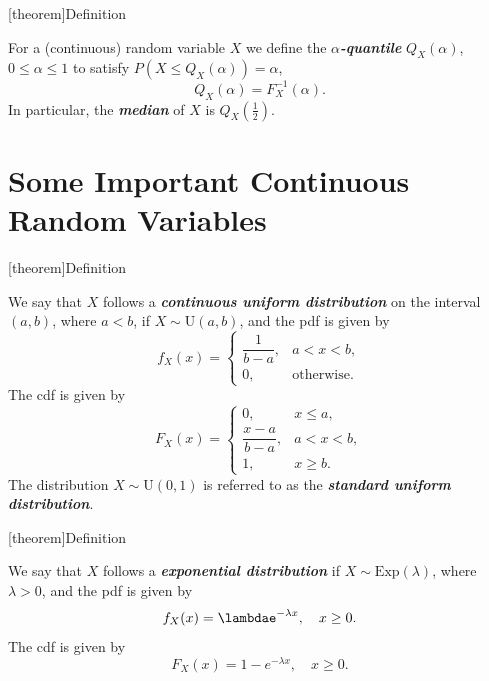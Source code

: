 \documentclass[12pt]{report}
\theoremstyle{definition}
\begin{document}
[theorem]{Definition}
\begin{quantiles}
    For a (continuous) random variable $X$ we define the
    \textbf{\emph{$\alpha$-quantile}} $Q_X(\alpha)$,
    $0\le\alpha\le 1$ to satisfy $P(X\le Q_X(\alpha))=\alpha$,
    \[
        Q_X(\alpha)=F_X^{-1}(\alpha).
    \]
    In particular, the \textbf{\emph{median}} of $X$ is
    $Q_X\left(\frac{1}{2}\right)$.
\end{quantiles}

\section{Some Important Continuous Random Variables}

[theorem]{Definition}
\begin{continuous uniform distribution}
    We say that $X$ follows a \textbf{\emph{continuous uniform distribution}} 
    on the interval $(a,b)$, where $a<b$, if
    $X\sim\text{U}(a,b)$, and the pdf is
    given by
    \[
        f_X(x)=
        \begin{cases}
            \dfrac{1}{b-a}, & a<x<b, \\[10pt]
            0, & \text{otherwise}.
        \end{cases} 
    \]
    The cdf is given by
    \[
        F_X(x)=
        \begin{cases}
            0, & x\le a, \\[5pt]
            \dfrac{x-a}{b-a}, & a<x<b, \\[10pt]
            1, & x\ge b.
        \end{cases} 
    \]
    The distribution $X\sim\text{U}(0,1)$ is referred to as the
    \textbf{\emph{standard uniform distribution}}.
\end{continuous uniform distribution}

[theorem]{Definition}
\begin{exponential distribution}
    We say that $X$ follows a \textbf{\emph{exponential distribution}} if
    $X\sim\text{Exp}(\lambda)$, where $\lambda>0$, and the pdf is given by
    \[
        f_X(x)=\lambdae^{-\lambda x}, \quad x\ge 0.
    \]
    The cdf is given by
    \[
        F_X(x)=1-e^{-\lambda x},\quad x\ge 0.
    \]
\end{exponential distribution}
\end{document}
